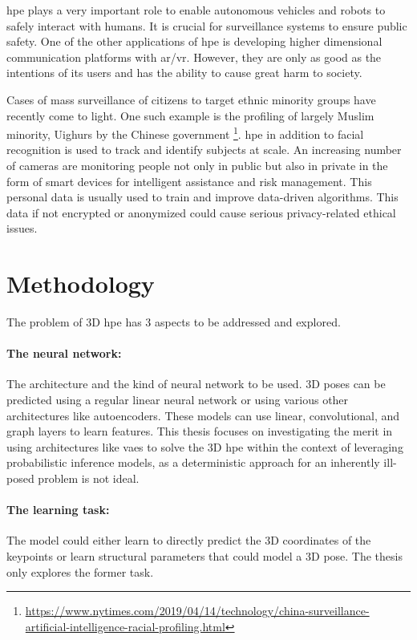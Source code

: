 \ac{hpe} plays a very important role to enable autonomous vehicles and robots to safely interact with humans. It is crucial for surveillance systems to ensure public safety. One of the other applications of \ac{hpe} is developing higher dimensional communication platforms with \ac{ar/vr}. However, they are only as good as the intentions of its users and has the ability to cause great harm to society. 

Cases of mass surveillance of citizens to target ethnic minority groups have recently come to light. One such example is the profiling of largely Muslim minority, Uighurs by the Chinese government \footnote{\url{https://www.nytimes.com/2019/04/14/technology/china-surveillance-artificial-intelligence-racial-profiling.html}}. \ac{hpe} in addition to facial recognition is used to track and identify subjects at scale. An increasing number of cameras are monitoring people not only in public but also in private in the form of smart devices for intelligent assistance and risk management. This personal data is usually used to train and improve data-driven algorithms. This data if not encrypted or anonymized could cause serious privacy-related ethical issues.

\section{Methodology}
\label{sec:methodology}
The problem of 3D \ac{hpe} has 3 aspects to be addressed and explored.

\paragraph{The neural network:} The architecture and the kind of neural network to be used. 3D poses can be predicted using a regular linear neural network or using various other architectures like autoencoders. These models can use linear, convolutional, and graph layers to learn features. This thesis focuses on investigating the merit in using architectures like \acp{vae} to solve the 3D \ac{hpe} within the context of leveraging probabilistic inference models, as a deterministic approach for an inherently ill-posed problem is not ideal.

\paragraph{The learning task:} The model could either learn to directly predict the 3D coordinates of the keypoints or learn structural parameters that could model a 3D pose. The thesis only explores the former task.

